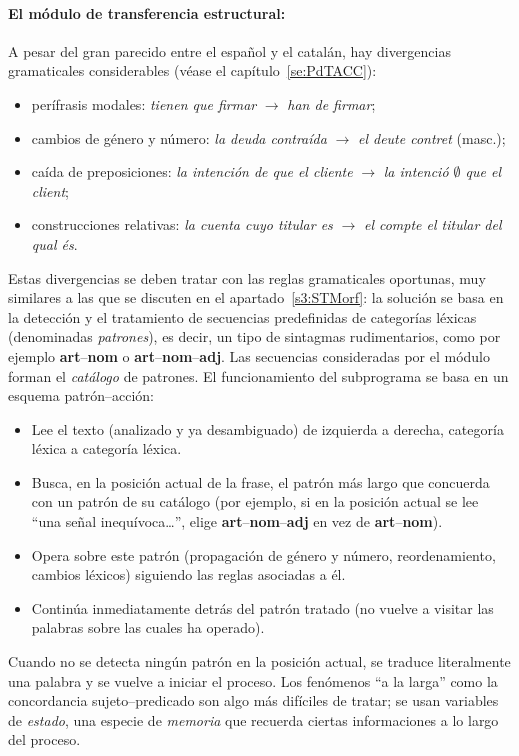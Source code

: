 \paragraph{El módulo de transferencia estructural:} A pesar del gran parecido entre el español y el catalán, hay divergencias gramaticales considerables (véase el capítulo~\ref{se:PdTACC}): \begin{itemize} \item perífrasis modales: \emph{tienen que firmar} $\rightarrow$ \emph{han de firmar}; \item cambios de género y número: \emph{la deuda contraída} $\rightarrow$ \emph{el deute contret} (masc.); \item caída de preposiciones: \emph{la intención de que el cliente} $\rightarrow$ \emph{la intenció $\emptyset$ que el client}; \item construcciones relativas: \emph{la cuenta cuyo titular es} $\rightarrow$ \emph{el compte el titular del qual és}. \end{itemize} Estas divergencias se deben tratar con las reglas gramaticales oportunas, muy similares a las que se discuten en el apartado~\ref{s3:STMorf}: la solución se basa en la detección y el tratamiento de secuencias predefinidas de categorías léxicas (denominadas \emph{patrones}), es decir, un tipo de sintagmas rudimentarios, como por ejemplo {\bf art}--{\bf nom} o {\bf art}--{\bf nom}--{\bf adj}. Las secuencias consideradas por el módulo  forman el \emph{catálogo} de patrones. El funcionamiento del subprograma se basa en un esquema patrón--acción: \begin{itemize} \item Lee el texto (analizado y ya desambiguado) de izquierda a derecha, categoría léxica a categoría léxica. \item Busca, en la posición actual de la frase, el patrón más largo que concuerda con un patrón de su catálogo (por ejemplo, si en la posición actual se lee ``una señal inequívoca\ldots'', elige {\bf art}--{\bf nom}--{\bf adj} en vez de {\bf art}--{\bf nom}). \item Opera sobre este patrón (propagación de género y número, reordenamiento, cambios léxicos) siguiendo las reglas asociadas a él. \item Continúa inmediatamente detrás del patrón tratado (no vuelve a visitar las palabras sobre las cuales ha operado). \end{itemize} Cuando no se detecta ningún patrón en la posición actual, se traduce literalmente una palabra y se vuelve a iniciar el proceso. Los fenómenos ``a la larga'' como la concordancia sujeto--predicado son algo más difíciles de tratar; se usan variables de \emph{estado}, una especie de \emph{memoria } que recuerda ciertas informaciones a lo largo del proceso. 

